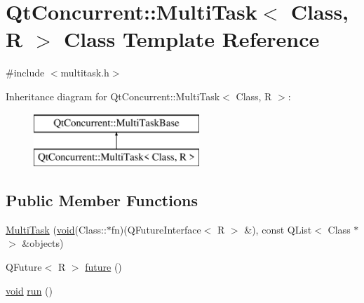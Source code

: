 \hypertarget{class_qt_concurrent_1_1_multi_task}{\section{\-Qt\-Concurrent\-:\-:\-Multi\-Task$<$ \-Class, \-R $>$ \-Class \-Template \-Reference}
\label{class_qt_concurrent_1_1_multi_task}
}


{\ttfamily \#include $<$multitask.\-h$>$}

\-Inheritance diagram for \-Qt\-Concurrent\-:\-:\-Multi\-Task$<$ \-Class, \-R $>$\-:\begin{figure}[H]
\begin{center}
\leavevmode
\includegraphics[height=2.000000cm]{class_qt_concurrent_1_1_multi_task}
\end{center}
\end{figure}
\subsection*{\-Public \-Member \-Functions}
\begin{DoxyCompactItemize}
\item 
\hyperlink{class_qt_concurrent_1_1_multi_task_aa839f8564fe6ee6328cd5f70de768e64}{\-Multi\-Task} (\hyperlink{group___u_a_v_objects_plugin_ga444cf2ff3f0ecbe028adce838d373f5c}{void}(\-Class\-::$\ast$fn)(\-Q\-Future\-Interface$<$ \-R $>$ \&), const \-Q\-List$<$ \-Class $\ast$ $>$ \&objects)
\item 
\-Q\-Future$<$ \-R $>$ \hyperlink{class_qt_concurrent_1_1_multi_task_ab94942bb48be4f01215349658f8db85a}{future} ()
\item 
\hyperlink{group___u_a_v_objects_plugin_ga444cf2ff3f0ecbe028adce838d373f5c}{void} \hyperlink{class_qt_concurrent_1_1_multi_task_a73e6ffb5d035f73961613b55db9f4dbf}{run} ()
\end{DoxyCompactItemize}
